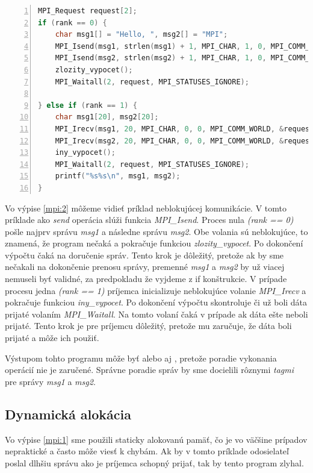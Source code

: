 \begin{lstlisting}[language=c, caption={Neblokujúca komunikácia}, label={mpi:2}, numbers=left]
MPI_Request request[2];
if (rank == 0) {
    char msg1[] = "Hello, ", msg2[] = "MPI";
    MPI_Isend(msg1, strlen(msg1) + 1, MPI_CHAR, 1, 0, MPI_COMM_WORLD, &request[0]);
    MPI_Isend(msg2, strlen(msg2) + 1, MPI_CHAR, 1, 0, MPI_COMM_WORLD, &request[1]);
    zlozity_vypocet();
    MPI_Waitall(2, request, MPI_STATUSES_IGNORE);

} else if (rank == 1) {
    char msg1[20], msg2[20];
    MPI_Irecv(msg1, 20, MPI_CHAR, 0, 0, MPI_COMM_WORLD, &request[0]);
    MPI_Irecv(msg2, 20, MPI_CHAR, 0, 0, MPI_COMM_WORLD, &request[1]);
    iny_vypocet();
    MPI_Waitall(2, request, MPI_STATUSES_IGNORE);
    printf("%s%s\n", msg1, msg2);
}
\end{lstlisting}

Vo výpise \ref{mpi:2} môžeme vidieť príklad neblokujúcej komunikácie. V tomto príklade ako \textit{send} operácia slúži funkcia \textit{MPI\_Isend}.
Proces nula \textit{(rank == 0)} pošle najprv správu \textit{msg1} a následne správu \textit{msg2}.
Obe volania sú neblokujúce, to znamená, že program nečaká
a pokračuje funkciou \textit{zlozity\_vypocet}. Po dokončení výpočtu čaká na doručenie správ.
Tento krok je dôležitý, pretože ak by sme nečakali na dokončenie prenosu správy, premenné \textit{msg1} a \textit{msg2} by už viacej nemuseli byť validné,
za predpokladu že vyjdeme z if konštrukcie.
V prípade procesu jedna \textit{(rank == 1)} príjemca inicializuje neblokujúce volanie \textit{MPI\_Irecv} a pokračuje funkciou \textit{iny\_vypocet}.
Po dokončení výpočtu skontroluje či už boli dáta prijaté volaním \textit{MPI\_Waitall}.
Na tomto volaní čaká v prípade ak dáta ešte neboli prijaté.
Tento krok je pre príjemcu dôležitý, pretože mu zaručuje, že dáta boli prijaté a môže ich použiť.

Výstupom tohto programu môže byť  alebo aj , pretože poradie vykonania operácií nie je zaručené.
Správne poradie správ by sme docielili rôznymi \textit{tagmi} pre správy \textit{msg1} a \textit{msg2}.
\subsection{Dynamická alokácia}
Vo výpise \ref{mpi:1} sme použili staticky alokovanú pamäť, čo je vo väčšine prípadov nepraktické a často môže viesť k chybám.
Ak by v tomto príklade odosielateľ poslal dlhšiu správu ako je príjemca schopný prijať, tak by tento program zlyhal.

